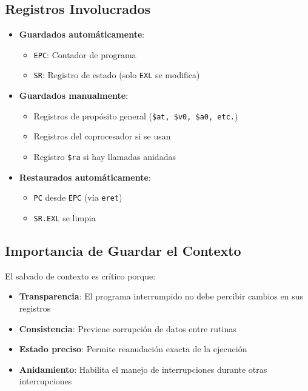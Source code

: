 \documentclass{article}
\begin{document}
\subsection{Registros Involucrados}
\begin{itemize}
    \item \textbf{Guardados automáticamente}:
    \begin{itemize}
        \item \texttt{EPC}: Contador de programa
        \item \texttt{SR}: Registro de estado (solo \texttt{EXL} se modifica)
    \end{itemize}

    \item \textbf{Guardados manualmente}:
    \begin{itemize}
        \item Registros de propósito general (\texttt{\$at, \$v0, \$a0, etc.})
        \item Registros del coprocesador si se usan
        \item Registro \texttt{\$ra} si hay llamadas anidadas
    \end{itemize}

    \item \textbf{Restaurados automáticamente}:
    \begin{itemize}
        \item \texttt{PC} desde \texttt{EPC} (vía \texttt{eret})
        \item \texttt{SR.EXL} se limpia
    \end{itemize}
\end{itemize}

\subsection{Importancia de Guardar el Contexto}

El salvado de contexto es crítico porque:

\begin{itemize}
    \item \textbf{Transparencia}: El programa interrumpido no debe percibir cambios en sus registros
    \item \textbf{Consistencia}: Previene corrupción de datos entre rutinas
    \item \textbf{Estado preciso}: Permite reanudación exacta de la ejecución
    \item \textbf{Anidamiento}: Habilita el manejo de interrupciones durante otras interrupciones
\end{itemize}
\end{document}
